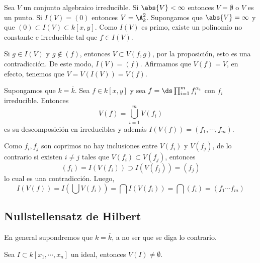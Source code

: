 \documentclass{article}
\begin{document}
\begin{dem}
    Sea $V$ un conjunto algebraico irreducible. Si $\abs{V}<\infty$ entonces $V=\emptyset$ o $V$
    es un punto. Si $I(V)=(0)$ entonces $V=\A_{k}^{2}$. Supongamos que $\abs{V}=\infty$ y que
    $(0)\subset I(V)\subset k[x,y]$. Como $I(V)$ es primo, existe un polinomio no constante e
    irreducible tal que $f\in I(V)$.
    \vspace{4mm}

    \noindent Si $g\in I(V)$ y $g\not\in(f)$, entonces $V\subset V(f,g)$, por la proposición, esto
    es una contradicción. De este modo, $I(V)=(f)$. Afirmamos que $V(f)=V$, en efecto, tenemos que
    $V=V(I(V))=V(f)$.
\end{dem}

\begin{cor}
    Supongamos que $k=\overline{k}$. Sea $f\in k[x,y]$ y sea $f=\ds\prod_{i=1}^{m}f_{i}^{\alpha_{i}}$
    con $f_{i}$ irreducible. Entonces
    \begin{equation*}
        V(f)=\bigcup_{i=1}^{m}V(f_{i})
    \end{equation*}
    es su descomposición en irreducibles y además $I(V(f))=(f_{1},\cdots,f_{m})$.
\end{cor}

\begin{dem}
    Como $f_{i},f_{j}$ son coprimos no hay inclusiones entre $V(f_{i})$ y $V(f_{j})$, de lo 
    contrario si existen $i\neq j$ tales que $V(f_{i})\subset V(f_{j})$, entonces
    \begin{equation*}
        (f_{i})=I(V(f_{i}))\supset I(V(f_{j}))=(f_{j})
    \end{equation*}
    lo cual es una contradicción. Luego,
    \begin{equation*}
        I(V(f))=I\left(\bigcup V(f_{i})\right)=\bigcap I(V(f_{i}))=\bigcap(f_{i})=
        (f_{1}\cdots f_{m})
    \end{equation*}
\end{dem}

\subsection{Nullstellensatz de Hilbert}
\noindent En general supondremos que $k=\overline{k}$, a no ser que se diga lo contrario.

\begin{teo}
    Sea $I\subset k[x_{1},\cdots,x_{n}]$ un ideal, entonces $V(I)\neq\emptyset$.
\end{teo}
\end{document}

